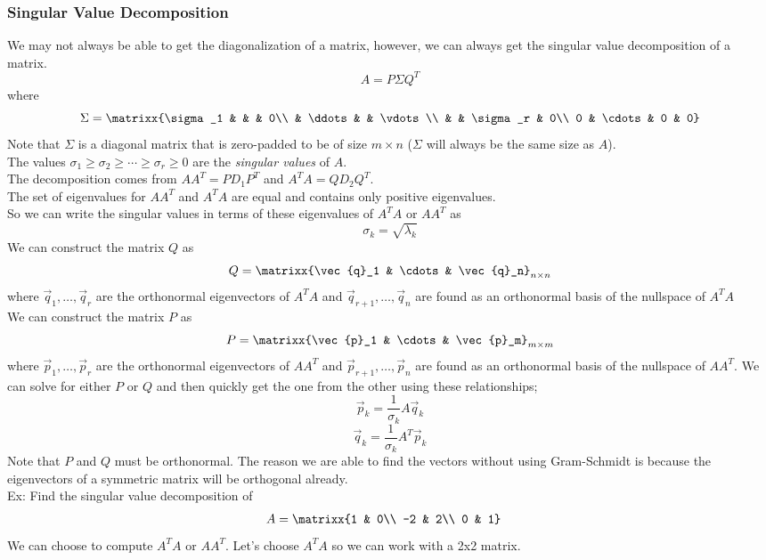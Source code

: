 \subsubsection{Singular Value Decomposition}
We may not always be able to get the diagonalization of a matrix, however, we can always get the singular value decomposition of a matrix.
$$A=P\Sigma Q^T$$
where
$$\Sigma=\matrixx{\sigma_1 & & & 0\\ & \ddots & & \vdots\\ & & \sigma_r & 0\\ 0 & \cdots & 0 & 0}$$
Note that $\Sigma$ is a diagonal matrix that is zero-padded to be of size $m\times n$ ($\Sigma$ will always be the same size as $A$).\\
The values $\sigma_1\geq \sigma_2\geq\cdots\geq \sigma_r\geq 0$ are the \textit{singular values} of $A$.\\
The decomposition comes from $AA^T=PD_1P^T$ and $A^TA=QD_2Q^T$.\\
The set  of eigenvalues for $AA^T$ and $A^TA$ are equal and contains only positive eigenvalues.\\
So we can write the singular values in terms of these eigenvalues of $A^TA$ or $AA^T$ as
$$\sigma_k=\sqrt{\lambda_k}$$
We can construct the matrix $Q$ as
$$Q=\matrixx{\vec{q}_1 & \cdots & \vec{q}_n}_{n\times n}$$
where $\vec{q}_1,\ldots,\vec{q}_r$ are the orthonormal eigenvectors of $A^TA$ and $\vec{q}_{r+1},\ldots,\vec{q}_n$ are found as an orthonormal basis of the nullspace of $A^TA$\\
We can construct the matrix $P$ as
$$P=\matrixx{\vec{p}_1 & \cdots & \vec{p}_m}_{m\times m}$$
where $\vec{p}_1,\ldots,\vec{p}_r$ are the orthonormal eigenvectors of $AA^T$ and $\vec{p}_{r+1},\ldots,\vec{p}_n$ are found as an orthonormal basis of the nullspace of $AA^T$.
We can solve for either $P$ or $Q$ and then quickly get the one from the other using these relationships;
$$\vec{p}_k=\frac{1}{\sigma_k}A\vec{q}_k$$
$$\vec{q}_k=\frac{1}{\sigma_k}A^T\vec{p}_k$$
Note that $P$ and $Q$ must be orthonormal. The reason we are able to find the vectors without using Gram-Schmidt is because the eigenvectors of a symmetric matrix will be orthogonal already.\\
Ex: Find the singular value decomposition of
\begin{align*}
    &A=\matrixx{1 & 0\\ -2 & 2\\ 0 & 1}
\end{align*}
We can choose to compute $A^TA$ or $AA^T$. Let's choose $A^TA$ so we can work with a 2x2 matrix.
